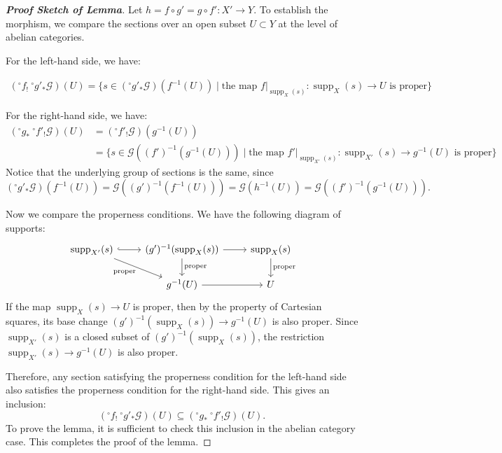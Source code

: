 \begin{proof}[\textbf{Proof Sketch of Lemma}]
Let $h = f \circ g' = g \circ f' \colon X' \to Y$. 
To establish the morphism, 
we compare the sections over an open subset $U \subset Y$ at the level of abelian categories.

For the left-hand side, we have:

\begin{align*}
    (^\circ f_!\  {}^\circ g'_* \mathcal{G})(U) = \{ s \in (^\circ g'_* \mathcal{G})(f^{-1}(U)) \mid \text{the map } f|_{\operatorname{supp}_X(s)} \colon \operatorname{supp}_X(s) \to U \text{ is proper} \}
\end{align*}

For the right-hand side, we have:
\begin{align*}
    (^\circ g_* \ ^\circ f'_! \mathcal{G})(U) &= (^\circ f'_! \mathcal{G})(g^{-1}(U)) \\
    &= \{ s \in \mathcal{G}((f')^{-1}(g^{-1}(U))) \mid \text{the map } f'|_{\operatorname{supp}_{X'}(s)} \colon \operatorname{supp}_{X'}(s) \to g^{-1}(U) \text{ is proper} \}
\end{align*}
Notice that the underlying group of sections is the same, since
\begin{equation*}
    (^\circ g'_* \mathcal{G})(f^{-1}(U)) = \mathcal{G}((g')^{-1}(f^{-1}(U))) = \mathcal{G}(h^{-1}(U)) = \mathcal{G}((f')^{-1}(g^{-1}(U))).
\end{equation*}

Now we compare the properness conditions. We have the following diagram of supports:
\begin{equation*}
\begin{tikzcd}
    \operatorname{supp}_{X'}(s) \arrow[r, hook] \arrow[dr, "\text{proper}"'] & (g')^{-1}(\operatorname{supp}_X(s)) \arrow[r] \arrow[d, "\text{proper}"] & \operatorname{supp}_X(s) \arrow[d, "\text{proper}"] \\
    & g^{-1}(U) \arrow[r] & U
\end{tikzcd}
\end{equation*}
If the map $\operatorname{supp}_X(s) \to U$ is proper, then by the property of Cartesian squares, its base change $(g')^{-1}(\operatorname{supp}_X(s)) \to g^{-1}(U)$ is also proper. Since $\operatorname{supp}_{X'}(s)$ is a closed subset of $(g')^{-1}(\operatorname{supp}_X(s))$, the restriction $\operatorname{supp}_{X'}(s) \to g^{-1}(U)$ is also proper.

Therefore, any section satisfying the properness condition for the left-hand side also satisfies the properness condition for the right-hand side. This gives an inclusion:
\begin{equation*}
    (^\circ f_! \ ^\circ g'_* \mathcal{G})(U) \subseteq (^\circ g_* \ ^\circ f'_! \mathcal{G})(U).
\end{equation*}
To prove the lemma, it is sufficient to check this inclusion in the abelian category case. This completes the proof of the lemma.
\end{proof}

